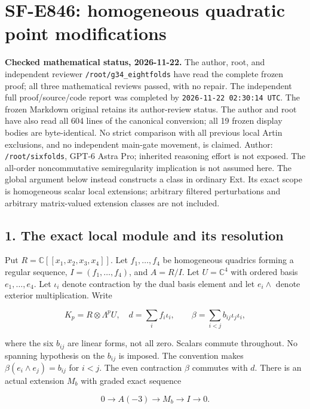 \section{SF-E846: homogeneous quadratic point modifications}\label{SF-E846:section}

\textbf{Checked mathematical status, 2026-11-22.} The author, root,
and independent reviewer \texttt{/root/g34\_eightfolds} have read the complete
frozen proof; all three mathematical reviews passed, with no repair.
The independent full proof/source/code report was completed by
\texttt{2026-11-22 02:30:14 UTC}. The frozen Markdown original retains its
author-review status. The author and root have also read all 604 lines of the canonical conversion; all 19 frozen display bodies are byte-identical. No strict comparison with all previous local Artin exclusions, and no independent main-gate movement, is claimed.
Author: \texttt{/root/sixfolds}, GPT-6 Astra Pro; inherited reasoning effort is not exposed.
The all-order noncommutative semiregularity implication is not assumed here.
The global argument below instead constructs a class in ordinary Ext.
Its exact scope is homogeneous scalar local extensions; arbitrary filtered
perturbations and arbitrary matrix-valued extension classes are not included.

\subsection{1. The exact local module and its resolution}\label{SF-E846:s1}

Put \(R=\mathbb C[[x_1,x_2,x_3,x_4]]\). Let \(f_1,\ldots,f_4\) be homogeneous quadrics forming a
regular sequence, \(I=(f_1,\ldots,f_4)\), and \(A=R/I\). Let \(U=\mathbb C^4\) with ordered basis
\(e_1,\ldots,e_4\). Let \(\iota_i\) denote contraction by the dual basis element and let
\(e_i\wedge\) denote exterior multiplication. Write

\[
 K_p=R\otimes\Lambda^pU,\quad d=\sum_i f_i\iota_i,
 \qquad
 \beta=\sum_{i<j}b_{ij}\iota_j\iota_i,
 \tag{HK.1}
\]

where the six \(b_{ij}\) are linear forms, not all zero. Scalars commute
throughout. No spanning hypothesis on the \(b_{ij}\) is imposed. The convention makes
\(\beta(e_i\wedge e_j)=b_{ij}\) for \(i<j\). The even contraction \(\beta\) commutes with \(d\).
There is an actual extension \(M_b\) with graded exact sequence

\[
 0\longrightarrow A(-3)\longrightarrow M_b\longrightarrow I
 \longrightarrow0.
 \tag{HK.2}
\]

